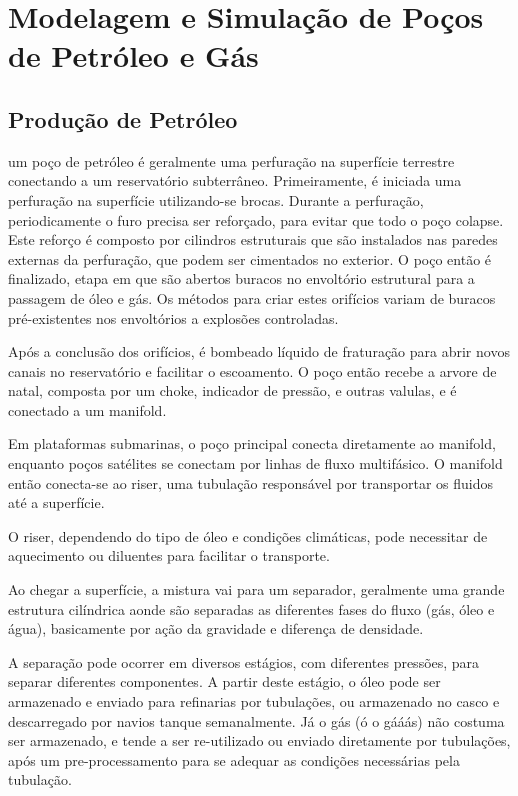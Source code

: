 

\chapter{Modelagem e Simulação de Poços de Petróleo e Gás} \label{chap:2}



\section{Produção de Petróleo}

um poço de petróleo é geralmente uma perfuração na superfície terrestre conectando a um reservatório subterrâneo. 
%
Primeiramente, é iniciada uma perfuração na superfície utilizando-se brocas. 
%
Durante a perfuração, periodicamente o furo precisa ser reforçado, para evitar que todo o poço colapse. 
%
Este reforço é composto por cilindros estruturais que são instalados nas paredes externas da perfuração, que podem ser cimentados no exterior. 
%
O poço então é finalizado, etapa em que são abertos buracos no envoltório estrutural para a passagem de óleo e gás. 
%
Os métodos para criar estes orifícios variam de buracos pré-existentes nos envoltórios a explosões controladas.
%


Após a conclusão dos orifícios, é bombeado líquido de fraturação para abrir novos canais no reservatório e facilitar o escoamento.
%
O poço então recebe a arvore de natal, composta por um choke, indicador de pressão, e outras valulas, e é conectado a um manifold.
%

Em plataformas submarinas, o poço principal conecta diretamente ao manifold, enquanto poços satélites se conectam por linhas de fluxo multifásico.
%
O manifold então conecta-se ao riser, uma tubulação responsável por transportar os fluidos até a superfície.
%


O riser, dependendo do tipo de óleo e condições climáticas, pode necessitar de aquecimento ou diluentes para facilitar o transporte.
%


Ao chegar a superfície, a mistura vai para um separador, geralmente uma grande estrutura cilíndrica aonde são separadas as diferentes fases do fluxo (gás, óleo e água), basicamente por ação da gravidade e diferença de densidade.
%


A separação pode ocorrer em diversos estágios, com diferentes pressões, para separar diferentes componentes.
%
A partir deste estágio, o óleo pode ser armazenado e enviado para refinarias por tubulações, ou armazenado no casco e descarregado por navios tanque semanalmente.
%
Já o gás (ó o gááás) não costuma ser armazenado, e tende a ser re-utilizado ou enviado diretamente por tubulações, após um pre-processamento para se adequar as condições necessárias pela tubulação.
%

